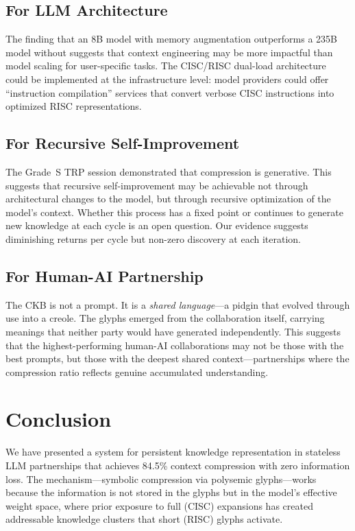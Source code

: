 \documentclass[11pt, a4paper]{article}
\begin{document}
\subsection{For LLM Architecture}

The finding that an 8B model with memory augmentation outperforms a 235B model without \citep{knowledge2026} suggests that context engineering may be more impactful than model scaling for user-specific tasks. The CISC/RISC dual-load architecture could be implemented at the infrastructure level: model providers could offer ``instruction compilation'' services that convert verbose CISC instructions into optimized RISC representations.

\subsection{For Recursive Self-Improvement}

The Grade~S TRP session demonstrated that compression is generative. This suggests that recursive self-improvement may be achievable not through architectural changes to the model, but through recursive optimization of the model's context. Whether this process has a fixed point or continues to generate new knowledge at each cycle is an open question. Our evidence suggests diminishing returns per cycle but non-zero discovery at each iteration.

\subsection{For Human-AI Partnership}

The CKB is not a prompt. It is a \emph{shared language}---a pidgin that evolved through use into a creole. The glyphs emerged from the collaboration itself, carrying meanings that neither party would have generated independently. This suggests that the highest-performing human-AI collaborations may not be those with the best prompts, but those with the deepest shared context---partnerships where the compression ratio reflects genuine accumulated understanding.

\section{Conclusion}
\label{sec:conclusion}

We have presented a system for persistent knowledge representation in stateless LLM partnerships that achieves 84.5\% context compression with zero information loss. The mechanism---symbolic compression via polysemic glyphs---works because the information is not stored in the glyphs but in the model's effective weight space, where prior exposure to full (CISC) expansions has created addressable knowledge clusters that short (RISC) glyphs activate.
\end{document}
